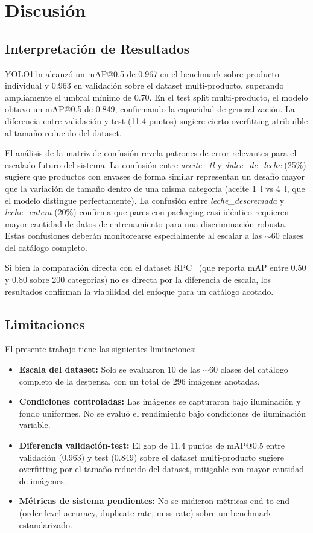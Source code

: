 \documentclass[conference,a4paper]{IEEEtran}[2015/08/26]
\begin{document}
\section{Discusión}
\label{sec:discusion}

\subsection{Interpretación de Resultados}

YOLO11n alcanzó un mAP@0.5 de 0.967 en el benchmark sobre producto individual y 0.963 en validación sobre el dataset multi-producto, superando ampliamente el umbral mínimo de 0.70. En el test split multi-producto, el modelo obtuvo un mAP@0.5 de 0.849, confirmando la capacidad de generalización. La diferencia entre validación y test (11.4 puntos) sugiere cierto overfitting atribuible al tamaño reducido del dataset.

El análisis de la matriz de confusión revela patrones de error relevantes para el escalado futuro del sistema. La confusión entre \textit{aceite\_1l} y \textit{dulce\_de\_leche} (25\%) sugiere que productos con envases de forma similar representan un desafío mayor que la variación de tamaño dentro de una misma categoría (aceite 1~l vs 4~l, que el modelo distingue perfectamente). La confusión entre \textit{leche\_descremada} y \textit{leche\_entera} (20\%) confirma que pares con packaging casi idéntico requieren mayor cantidad de datos de entrenamiento para una discriminación robusta. Estas confusiones deberán monitorearse especialmente al escalar a las $\sim$60 clases del catálogo completo.

Si bien la comparación directa con el dataset RPC~\cite{wei2019rpc} (que reporta mAP entre 0.50 y 0.80 sobre 200 categorías) no es directa por la diferencia de escala, los resultados confirman la viabilidad del enfoque para un catálogo acotado.

\subsection{Limitaciones}

El presente trabajo tiene las siguientes limitaciones:
\begin{itemize}
  \item \textbf{Escala del dataset:} Solo se evaluaron 10 de las $\sim$60 clases del catálogo completo de la despensa, con un total de 296 imágenes anotadas.
  \item \textbf{Condiciones controladas:} Las imágenes se capturaron bajo iluminación y fondo uniformes. No se evaluó el rendimiento bajo condiciones de iluminación variable.
  \item \textbf{Diferencia validación-test:} El gap de 11.4 puntos de mAP@0.5 entre validación (0.963) y test (0.849) sobre el dataset multi-producto sugiere overfitting por el tamaño reducido del dataset, mitigable con mayor cantidad de imágenes.
  \item \textbf{Métricas de sistema pendientes:} No se midieron métricas end-to-end (order-level accuracy, duplicate rate, miss rate) sobre un benchmark estandarizado.
\end{itemize}
\end{document}
